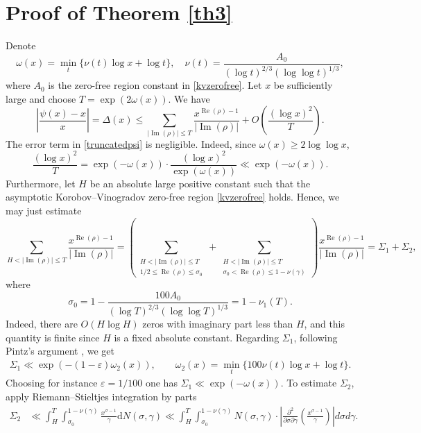 \documentclass[reqno]{amsart}
\numberwithin{equation}{section}
\theoremstyle{remark}
\begin{document}
\section{Proof of Theorem \ref{th3}}
Denote 
\[
\omega(x)=\min_t\{\nu(t)\log x+\log t\},\quad \nu(t)=\frac{A_0}{(\log t)^{2/3}(\log\log t)^{1/3}},
\]
where $A_0$ is the zero-free region constant in \eqref{kvzerofree}.
Let $x$ be sufficiently large and choose $T=\exp(2\omega(x))$. We have
\begin{equation}\label{truncatedpsi}
    \left|\frac{\psi(x)-x}{x}\right|=\Delta(x) \leq \sum_{|\operatorname{Im}(\rho)| \leq T} \frac{x^{\operatorname{Re}(\rho)-1}}{|\operatorname{Im}(\rho)|}+O\left(\frac{(\log x)^2}{T}\right).
\end{equation}
The error term in \eqref{truncatedpsi} is negligible. Indeed, since $\omega(x) \geq 2 \log \log x$,
$$
\frac{(\log x)^2}{T}=\exp (-\omega(x)) \cdot \frac{(\log x)^2}{\exp (\omega(x))} \ll \exp (-\omega(x)) .
$$
Furthermore, let $H$ be an absolute large positive constant such that the asymptotic Korobov--Vinogradov zero-free region \eqref{kvzerofree} holds. Hence, we may just estimate
$$
\sum_{H<|\operatorname{Im}(\rho)| \leq T} \frac{x^{\operatorname{Re}(\rho)-1}}{|\operatorname{Im}(\rho)|}=\left(\sum_{\substack{H<|\operatorname{Im}(\rho)| \leq T \\ 1 / 2 \leq \operatorname{Re}(\rho) \leq \sigma_0}}+\sum_{\substack{H<|\operatorname{Im}(\rho)| \leq T \\ \sigma_0<\operatorname{Re}(\rho) \leq 1-\nu(\gamma)}}\right) \frac{x^{\operatorname{Re}(\rho)-1}}{|\operatorname{Im}(\rho)|}=\Sigma_1+\Sigma_2,
$$
where
\[
\sigma_0=1-\frac{100A_0}{(\log T)^{2/3}(\log\log T)^{1/3}}=1-\nu_1(T).
\]
Indeed, there are $O(H\log H)$ zeros with imaginary part less than $H$, and this quantity is finite since $H$ is a fixed absolute constant. Regarding $\Sigma_1$, following Pintz's argument \cite{pintz80}, we get
\begin{align*}
    \Sigma_1\ll \exp(-(1-\varepsilon)\omega_2(x)),\qquad \omega_2(x)=\min_t\{100\nu(t)\log x+\log t\}.
\end{align*}
Choosing for instance $\varepsilon=1/100$ one has $\Sigma_1\ll \exp(-\omega(x)).$
To estimate $\Sigma_2$, apply Riemann--Stieltjes integration by parts
\begin{align*}
    \Sigma_2&\ll \int_{H}^T\int_{\sigma_0}^{1-\nu(\gamma)}\frac{x^{\sigma-1}}{\gamma}\text{d}N(\sigma,\gamma)\ll \int_{H}^T\int_{\sigma_0}^{1-\nu(\gamma)} N(\sigma, \gamma) \cdot\left|\frac{\partial^2 }{\partial \sigma \partial \gamma}\left(\frac{x^{\sigma-1}}{\gamma}\right)\right| d \sigma d \gamma.
\end{align*}
\end{document}
